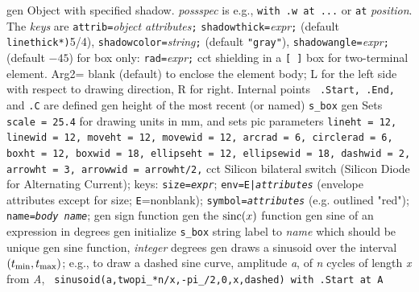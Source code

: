 %
  {gen}%
  { Object with specified shadow.  {\sl possspec} is e.g.,
    {\tt with .w at ...} or {\tt at} {\sl position}.
    The {\sl keys} are
       {\tt attrib=}{\sl object attributes}{\tt ;}
       {\tt shadowthick=}{\sl expr}{\tt ;} (default {\tt linethick*)}5/4),
       {\tt shadowcolor=}{\sl string}{\tt ;} (default {\tt "gray"}),
       {\tt shadowangle=}{\sl expr}{\tt ;} (default $-45$)
       for box only: {\tt rad=}{\sl expr}{\tt ;}%
 }%
 {cct}%
  {shielding in a {\tt [ ]} box for
  two-terminal element. Arg2= blank
    (default) to enclose the element body; L for the left side with
    respect to drawing direction, R for right. Internal points {\tt
    .Start, .End,} and {\tt .C} are defined}%
%
  {gen}%
  {height of the most recent (or named) {\tt s\_box}%
    }%
%
  {gen}%
  {Sets {\tt scale = 25.4} for drawing units in mm, and sets
   pic parameters {\tt lineht = 12, linewid = 12, moveht = 12,
    movewid = 12,
    arcrad = 6, circlerad = 6, boxht = 12, boxwid = 18, ellipseht = 12,
    ellipsewid = 18, dashwid = 2, arrowht = 3, arrowwid = arrowht/2,}}%
%
  {cct}%
  { Silicon bilateral switch (Silicon Diode for Alternating Current);
   keys:
   {\tt size={\sl expr}};
   {\tt env=E|{\sl attributes}} (envelope attributes except for size;
     {\tt  E}=nonblank);
   {\tt symbol={\sl attributes}} (e.g. outlined "red");
   {\tt name={\sl body name}};}%
%
  {gen}%
  {sign function}%
%
  {gen}%
  {the $\hbox{sinc}(x)$ function}%
%
  {gen}%
  {sine of an expression in degrees}%
%
  {gen}%
  {initialize {\tt s\_box} string label to {\sl name} which should
  be unique
    }%
%
  {gen}%
  {sine function, {\sl integer\/} degrees}%
%
  {gen}%
  {draws a sinusoid over the interval $(t_{\hbox{\scriptsize min}},
  t_{\hbox{\scriptsize max}})$;
   e.g., to draw a dashed sine curve, amplitude {\sl a},
   of {\sl n} cycles of length {\sl x} from {\sl A}, {\tt
   sinusoid(a,twopi\_*n/x,-pi\_/2,0,x,dashed) with .Start at A}}%


